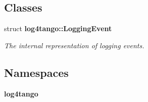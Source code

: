 \subsection*{Classes}
\begin{DoxyCompactItemize}
\item 
struct {\bf log4tango\-::\-Logging\-Event}
\begin{DoxyCompactList}\small\item\em The internal representation of logging events. \end{DoxyCompactList}\end{DoxyCompactItemize}
\subsection*{Namespaces}
\begin{DoxyCompactItemize}
\item 
{\bf log4tango}
\end{DoxyCompactItemize}
